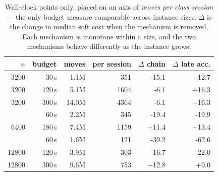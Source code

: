 \begin{table}[t]
\centering
\caption{Wall-clock points only, placed on an axis of \emph{moves per class session} --- the only budget measure comparable across instance sizes. $\Delta$ is the change in median soft cost when the mechanism is removed. Each mechanism is monotone within a size, and the two mechanisms behave differently as the instance grows.}
\label{tab:crossings}
\small
\begin{tabular}{@{}rrrrrr@{}}
\toprule
$n$ & budget & moves & per session & $\Delta$ chain & $\Delta$ late acc. \\
\midrule
3200 & 30\,s & 1.1M & 351 & -15.1 & -12.7 \\
3200 & 120\,s & 5.1M & 1604 & -6.1 & +16.3 \\
3200 & 300\,s & 14.0M & 4364 & -6.1 & +16.3 \\
\addlinespace
6400 & 60\,s & 2.2M & 345 & -19.4 & -19.9 \\
6400 & 180\,s & 7.4M & 1159 & +11.4 & +13.4 \\
\addlinespace
12800 & 60\,s & 1.6M & 121 & -39.2 & -62.6 \\
12800 & 120\,s & 3.9M & 303 & -16.7 & -22.0 \\
12800 & 300\,s & 9.6M & 753 & +12.8 & +9.0 \\
\bottomrule
\end{tabular}
\end{table}
